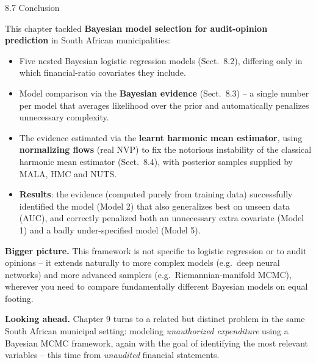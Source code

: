 \documentclass[aspectratio=169,10pt]{beamer}
\begin{document}
\begin{frame}[allowframebreaks]{8.7 Conclusion}

This chapter tackled \textbf{Bayesian model selection for audit-opinion prediction} in South African municipalities:

\begin{itemize}
  \item Five nested Bayesian logistic regression models (Sect.\ 8.2), differing only in which financial-ratio covariates they include.
  \item Model comparison via the \textbf{Bayesian evidence} (Sect.\ 8.3) -- a single number per model that averages likelihood over the prior and automatically penalizes unnecessary complexity.
  \item The evidence estimated via the \textbf{learnt harmonic mean estimator}, using \textbf{normalizing flows} (real NVP) to fix the notorious instability of the classical harmonic mean estimator (Sect.\ 8.4), with posterior samples supplied by MALA, HMC and NUTS.
  \item \textbf{Results}: the evidence (computed purely from training data) successfully identified the model (Model 2) that also generalizes best on unseen data (AUC), and correctly penalized both an unnecessary extra covariate (Model 1) and a badly under-specified model (Model 5).
\end{itemize}

\framebreak

\textbf{Bigger picture.} This framework is not specific to logistic regression or to audit opinions -- it extends naturally to more complex models (e.g.\ deep neural networks) and more advanced samplers (e.g.\ Riemannian-manifold MCMC), wherever you need to compare fundamentally different Bayesian models on equal footing.

\vspace{0.3cm}
\textbf{Looking ahead.} Chapter 9 turns to a related but distinct problem in the same South African municipal setting: modeling \emph{unauthorized expenditure} using a Bayesian MCMC framework, again with the goal of identifying the most relevant variables -- this time from \emph{unaudited} financial statements.

\end{frame}
\end{document}
